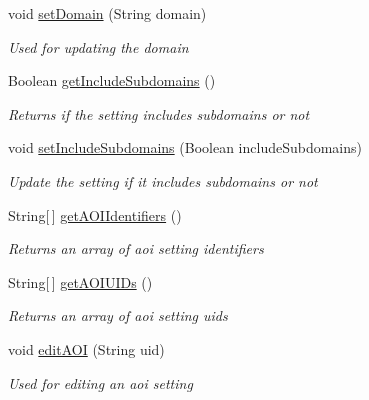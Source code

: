 \begin{DoxyCompactItemize}
void \hyperlink{class_web_analyzer_1_1_u_i_1_1_interaction_objects_1_1_domain_setting_control_a0c63b0dc50c545f4f1f0a35a2391b855}{set\+Domain} (String domain)
\begin{DoxyCompactList}\small\item\em Used for updating the domain \end{DoxyCompactList}\item 
Boolean \hyperlink{class_web_analyzer_1_1_u_i_1_1_interaction_objects_1_1_domain_setting_control_ad83ffda676c2290766597c60b18d1518}{get\+Include\+Subdomains} ()
\begin{DoxyCompactList}\small\item\em Returns if the setting includes subdomains or not \end{DoxyCompactList}\item 
void \hyperlink{class_web_analyzer_1_1_u_i_1_1_interaction_objects_1_1_domain_setting_control_ac441d0f2d1d3b11027cea85d0c4a9e86}{set\+Include\+Subdomains} (Boolean include\+Subdomains)
\begin{DoxyCompactList}\small\item\em Update the setting if it includes subdomains or not \end{DoxyCompactList}\item 
String\mbox{[}$\,$\mbox{]} \hyperlink{class_web_analyzer_1_1_u_i_1_1_interaction_objects_1_1_domain_setting_control_ab0d5543794158ae46676a22a7a26c969}{get\+A\+O\+I\+Identifiers} ()
\begin{DoxyCompactList}\small\item\em Returns an array of aoi setting identifiers \end{DoxyCompactList}\item 
String\mbox{[}$\,$\mbox{]} \hyperlink{class_web_analyzer_1_1_u_i_1_1_interaction_objects_1_1_domain_setting_control_a8353bbc458740227e1ed2a3ab2eb0566}{get\+A\+O\+I\+U\+I\+Ds} ()
\begin{DoxyCompactList}\small\item\em Returns an array of aoi setting uids \end{DoxyCompactList}\item 
void \hyperlink{class_web_analyzer_1_1_u_i_1_1_interaction_objects_1_1_domain_setting_control_aaffb07c5ebd6252c650723134ac9c0f4}{edit\+A\+O\+I} (String uid)
\begin{DoxyCompactList}\small\item\em Used for editing an aoi setting \end{DoxyCompactList}\item 

\end{DoxyCompactItemize}
